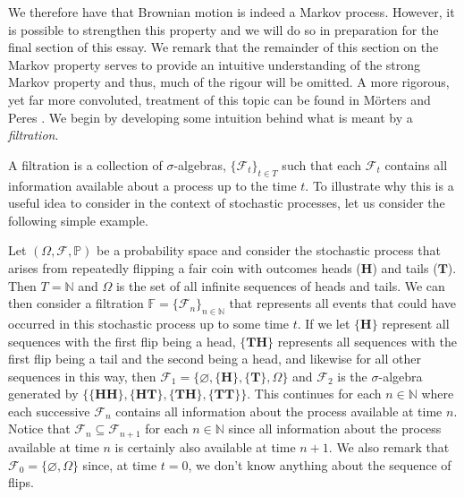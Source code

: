 \documentclass[a4paper,11pt]{article}
\theoremstyle{plain}
\theoremstyle{definition}
\begin{document}

We therefore have that Brownian motion is indeed a Markov process. However, it is possible to strengthen this property and we will do so in preparation for the final section of this essay. We remark that the remainder of this section on the Markov property serves to provide an intuitive understanding of the strong Markov property and thus, much of the rigour will be omitted. A more rigorous, yet far more convoluted, treatment of this topic can be found in M\"orters and Peres \citep[pp.~37--44]{M&P}. We begin by developing some intuition behind what is meant by a \textit{filtration}.

A filtration is a collection of $\sigma$-algebras, $\{\mathcal{F}_t\}_{t \in T}$ such that each $\mathcal{F}_t$ contains all information available about a process up to the time $t$. To illustrate why this is a useful idea to consider in the context of stochastic processes, let us consider the following simple example. 

Let $(\Omega,\mathcal{F},\mathbb{P})$ be a probability space and consider the stochastic process that arises from repeatedly flipping a fair coin with outcomes heads ($\mathbf{H}$) and tails ($\mathbf{T}$). Then $T = \mathbb{N}$ and $\Omega$ is the set of all infinite sequences of heads and tails. We can then consider a filtration $\mathbb{F} = \{\mathcal{F}_n\}_{n \in \mathbb{N}}$ that represents all events that could have occurred in this stochastic process up to some time $t$. If we let $\{\mathbf{H}\}$ represent all sequences with the first flip being a head, $\{\mathbf{TH}\}$ represents all sequences with the first flip being a tail and the second being a head, and likewise for all other sequences in this way, then $\mathcal{F}_1 = \{\varnothing,\{\mathbf{H}\},\{\mathbf{T}\},\Omega\}$ and $\mathcal{F}_2$ is the $\sigma$-algebra generated by $\{\{\mathbf{HH}\},\{\mathbf{HT}\},\{\mathbf{TH}\},\{\mathbf{TT}\}\}$. This continues for each $n \in \mathbb{N}$ where each successive $\mathcal{F}_n$ contains all information about the process available at time $n$. Notice that $\mathcal{F}_n \subseteq \mathcal{F}_{n+1}$ for each $n \in \mathbb{N}$ since all information about the process available at time $n$ is certainly also available at time $n+1$. We also remark that $\mathcal{F}_0 = \{\varnothing, \Omega\}$ since, at time $t = 0$, we don't know anything about the sequence of flips.
\end{document}
